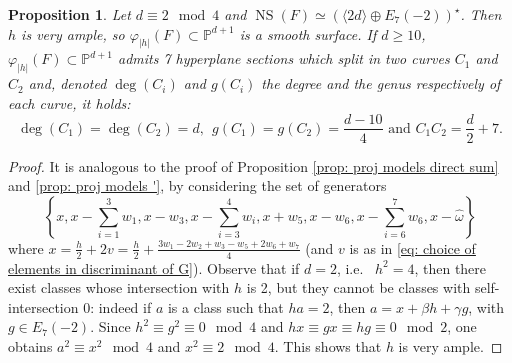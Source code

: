 \documentclass{amsart}
\newtheorem{prop}[thm]{Proposition}
\theoremstyle{definition}
\numberwithin{equation}{section}
\numberwithin{equation}{section} \theoremstyle{definition}
\DeclareMathOperator{\NS}{NS}
\begin{document}
\begin{prop}\label{prop: proj models star}
Let $d\equiv 2\mod 4$ and  $\NS(F)\simeq (\langle 2d\rangle\oplus E_7(-2))^{\star}$. Then $h$ is very ample, so $\varphi_{|h|}(F)\subset\mathbb{P}^{d+1}$ is a smooth surface. If $d\geq 10$,  $\varphi_{|h|}(F)\subset\mathbb{P}^{d+1}$ admits 7 hyperplane sections which split in two curves $C_1$ and $C_2$ and, denoted $\deg(C_i)$ and $g(C_i)$ the degree and the genus respectively of each curve, it holds:
$$\deg(C_1)=\deg(C_2)=d,\ \ g(C_1)=g(C_2)=\frac{d-10}{4}\mbox{ and }C_1C_2=\frac{d}{2}+7.$$
\end{prop}
\begin{proof}
It is analogous to the proof of Proposition \ref{prop: proj models direct sum} and \ref{prop: proj models '}, by considering the set of generators 
$$\left\{x, x-\sum_{i=1}^3w_1,x-w_3, x-\sum_{i=3}^4w_i, x+w_5, x-w_6, x-\sum_{i=6}^7w_6, x-\hat{\omega}\right\}$$
where $x=\frac{h}{2}+2v=\frac{h}{2}+\frac{3w_1-2w_2+w_3-w_5+2w_6+w_7}{4}$ (and $v$ is as in \eqref{eq: choice of elements in discriminant of G}). Observe that if $d=2$, i.e.~ $h^2=4$, then there exist classes whose intersection with $h$ is 2, but they cannot be classes with self-intersection 0: indeed if $a$ is a class such that $ha=2$, then $a=x+\beta h+\gamma g$, with $g\in E_7(-2)$. Since $h^2\equiv g^2\equiv 0\mod 4$ and $hx\equiv gx\equiv hg\equiv 0\mod 2$, one obtains $a^2\equiv x^2\mod 4$ and $x^2\equiv 2\mod 4$. This shows that $h$ is very ample.
\end{proof}
\end{document}

